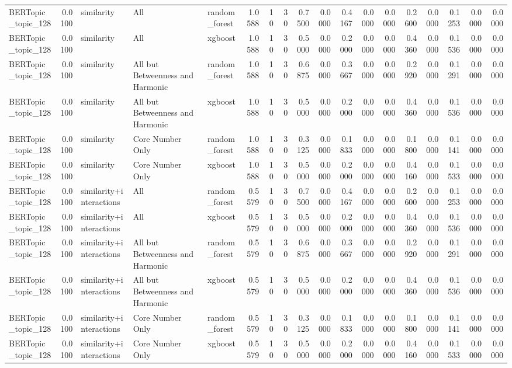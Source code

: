 \begin{tabular}{lrlllrrrrrrrrrrrrr}
BERTopic_topic_128 & 0.0100 & similarity & All & random_forest & 1.0588 & 10 & 30 & 0.7500 & 0.0000 & 0.4167 & 0.0000 & 0.0000 & 0.2600 & 0.0000 & 0.1253 & 0.0000 & 0.0000 \\
BERTopic_topic_128 & 0.0100 & similarity & All & xgboost & 1.0588 & 10 & 30 & 0.5000 & 0.0000 & 0.2000 & 0.0000 & 0.0000 & 0.4360 & 0.0000 & 0.1536 & 0.0000 & 0.0000 \\
BERTopic_topic_128 & 0.0100 & similarity & All but Betweenness and Harmonic & random_forest & 1.0588 & 10 & 30 & 0.6875 & 0.0000 & 0.3667 & 0.0000 & 0.0000 & 0.2920 & 0.0000 & 0.1291 & 0.0000 & 0.0000 \\
BERTopic_topic_128 & 0.0100 & similarity & All but Betweenness and Harmonic & xgboost & 1.0588 & 10 & 30 & 0.5000 & 0.0000 & 0.2000 & 0.0000 & 0.0000 & 0.4360 & 0.0000 & 0.1536 & 0.0000 & 0.0000 \\
BERTopic_topic_128 & 0.0100 & similarity & Core Number Only & random_forest & 1.0588 & 10 & 30 & 0.3125 & 0.0000 & 0.1833 & 0.0000 & 0.0000 & 0.1800 & 0.0000 & 0.1141 & 0.0000 & 0.0000 \\
BERTopic_topic_128 & 0.0100 & similarity & Core Number Only & xgboost & 1.0588 & 10 & 30 & 0.5000 & 0.0000 & 0.2000 & 0.0000 & 0.0000 & 0.4160 & 0.0000 & 0.1533 & 0.0000 & 0.0000 \\
BERTopic_topic_128 & 0.0100 & similarity+interactions & All & random_forest & 0.5579 & 10 & 30 & 0.7500 & 0.0000 & 0.4167 & 0.0000 & 0.0000 & 0.2600 & 0.0000 & 0.1253 & 0.0000 & 0.0000 \\
BERTopic_topic_128 & 0.0100 & similarity+interactions & All & xgboost & 0.5579 & 10 & 30 & 0.5000 & 0.0000 & 0.2000 & 0.0000 & 0.0000 & 0.4360 & 0.0000 & 0.1536 & 0.0000 & 0.0000 \\
BERTopic_topic_128 & 0.0100 & similarity+interactions & All but Betweenness and Harmonic & random_forest & 0.5579 & 10 & 30 & 0.6875 & 0.0000 & 0.3667 & 0.0000 & 0.0000 & 0.2920 & 0.0000 & 0.1291 & 0.0000 & 0.0000 \\
BERTopic_topic_128 & 0.0100 & similarity+interactions & All but Betweenness and Harmonic & xgboost & 0.5579 & 10 & 30 & 0.5000 & 0.0000 & 0.2000 & 0.0000 & 0.0000 & 0.4360 & 0.0000 & 0.1536 & 0.0000 & 0.0000 \\
BERTopic_topic_128 & 0.0100 & similarity+interactions & Core Number Only & random_forest & 0.5579 & 10 & 30 & 0.3125 & 0.0000 & 0.1833 & 0.0000 & 0.0000 & 0.1800 & 0.0000 & 0.1141 & 0.0000 & 0.0000 \\
BERTopic_topic_128 & 0.0100 & similarity+interactions & Core Number Only & xgboost & 0.5579 & 10 & 30 & 0.5000 & 0.0000 & 0.2000 & 0.0000 & 0.0000 & 0.4160 & 0.0000 & 0.1533 & 0.0000 & 0.0000 \\

\end{tabular}
